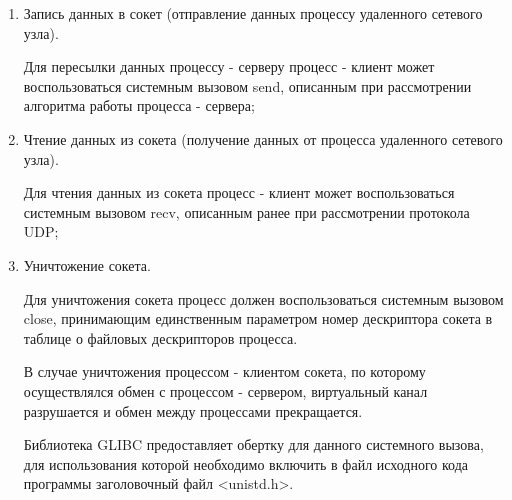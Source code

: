 \begin{enumerate}
		\item Запись данных в сокет (отправление данных процессу удаленного сетевого узла).
		
			Для пересылки данных процессу - серверу процесс - клиент может воспользоваться системным вызовом send, описанным при рассмотрении
			алгоритма работы процесса - сервера;

		\item Чтение данных из сокета (получение данных от процесса удаленного сетевого узла).

			Для чтения данных из сокета процесс - клиент может воспользоваться системным вызовом recv, описанным ранее при рассмотрении протокола UDP;

		\item Уничтожение сокета.

			Для уничтожения сокета процесс должен воспользоваться системным вызовом close, принимающим единственным параметром номер дескриптора
			сокета в таблице о файловых дескрипторов процесса.

			В случае уничтожения процессом - клиентом сокета, по которому осуществлялся обмен с процессом - сервером, виртуальный канал разрушается
			и обмен между процессами прекращается.
			
			Библиотека GLIBC предоставляет обертку для данного системного вызова, для использования которой необходимо включить в файл исходного кода программы
			заголовочный файл <unistd.h>.

	\end{enumerate}

